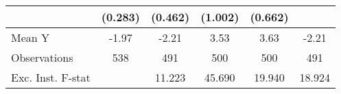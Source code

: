 {\begin{tabular}{l*{5}{c}}
            &     (0.283)         &     (0.462)         &     (1.002)         &     (0.662)         &                     \\
\midrule
Mean Y      &       -1.97         &       -2.21         &        3.53         &        3.63         &       -2.21         \\
Observations&         538         &         491         &         500         &         500         &         491         \\
Exc. Inst. F-stat&                     &      11.223         &      45.690         &      19.940         &      18.924         \\
\bottomrule
\end{tabular}
}
